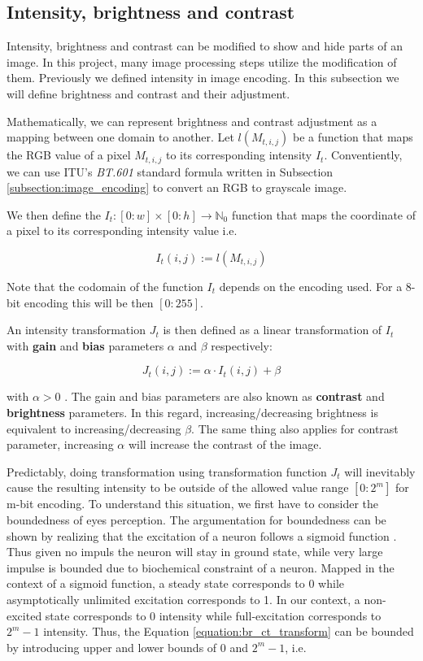 \documentclass[pdftex,12pt,a4paper]{report}
\begin{document}
\subsection{Intensity, brightness and contrast}
\label{subsection:brightness_contrast_adjustment}

Intensity, brightness and contrast can be modified to show and hide parts of an image. In this project, many image processing steps utilize the modification of them. Previously we defined  intensity in image encoding. In this subsection we will define brightness and contrast and their adjustment.

Mathematically, we can represent brightness and contrast adjustment as a mapping between one domain to another. Let $l(M_{t, i, j})$ be a function that maps the RGB value of a pixel $M_{t, i, j}$ to its corresponding intensity $I_t$. Conventiently, we can use ITU's \textit{BT.601} standard formula written in Subsection \ref{subsection:image_encoding} to convert an RGB to grayscale image.

We then define the $I_t: [0:w] \times [0:h] \rightarrow \mathbb{N}_0$ function that maps the coordinate of a pixel to its corresponding intensity value i.e.

$$
I_t(i, j) := l(M_{t, i, j})
$$

Note that the codomain of the function $I_t$ depends on the encoding used. For a 8-bit encoding this will be then $[0:255]$.

An intensity transformation $J_t$ is then defined as a linear transformation of $I_t$ with \textbf{gain} and \textbf{bias} parameters $\alpha$ and $\beta$ respectively:

\begin{equation}
\label{equation:br_ct_transform}
J_t(i, j) := \alpha \cdot I_t(i, j) + \beta
\end{equation}

with $\alpha > 0$ \cite{szeliski2010computer}. The gain and bias parameters are also known as \textbf{contrast} and \textbf{brightness} parameters. In this regard, increasing/decreasing brightness is equivalent to increasing/decreasing $\beta$. The same thing also applies for contrast parameter, increasing $\alpha$ will increase the contrast of the image.

Predictably, doing transformation using transformation function $J_t$ will inevitably cause the resulting intensity to be outside of the allowed value range $[0:2^m]$ for m-bit encoding. To understand this situation, we first have to consider the boundedness of eyes perception. The argumentation for boundedness can be shown by realizing that the excitation of a neuron follows a sigmoid function \cite{gazzaniga2004cognitive}. Thus given no impuls the neuron will stay in ground state, while very large impulse is bounded due to biochemical constraint of a neuron. Mapped in the context of a sigmoid function, a steady state corresponds to 0 while asymptotically unlimited excitation corresponds to 1. In our context, a non-excited state corresponds to 0 intensity while full-excitation corresponds to $2^m - 1$ intensity. Thus, the Equation \ref{equation:br_ct_transform} can be bounded by introducing upper and lower bounds of $0$ and $2^m - 1$, i.e.
\end{document}
